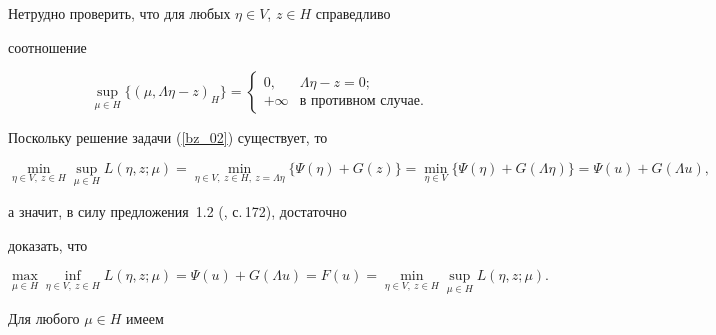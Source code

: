 \begin{pf}


Нетрудно проверить, что для любых $\eta \in V$, $z\in H$ справедливо


соотношение


$$


\sup_{\mu \in H} \{{(\mu, \Lambda \eta-z)_H}\}=


\begin{cases}


0, & \Lambda \eta-z=0;\\ 


+\infty & \text{в противном случае.}


\end{cases}


$$


Поскольку решение задачи (\ref{bz_02}) существует, то


\begin{equation}


\min_{\eta \in V,\ z \in H}


\sup_{\mu \in H} L (\eta, z; \mu)=


\min_{\eta \in V,\ z \in H,\ z=\Lambda \eta}


\{{\Psi (\eta)+G(z)}\}= 


\min_{\eta \in V} 


\{{\Psi (\eta)+G(\Lambda \eta)}\}=


\Psi (u)+G(\Lambda u),


\label{2bz5_1}


\end{equation}


а значит, в силу предложения~1.2 (\cite{ET_79}, с.\,172), достаточно


доказать, что 


\begin{equation}


\max_{\mu \in H} 


\inf_{\eta \in V,\ z\in H} L (\eta, z; \mu)=


\Psi (u)+G(\Lambda u)=


F(u)=\min_{\eta \in V,\ z \in H} 


\sup_{\mu \in H} L (\eta, z; \mu).


\label{2bz6}


\end{equation}


Для любого $\mu \in H$ имеем


\begin{multline}



\end{multline}
\end{pf}
